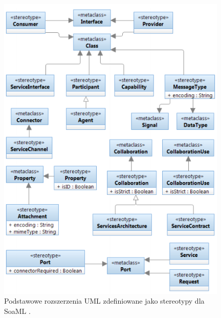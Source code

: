 \begin{figure}[h!tbp]
\begin{centering}
\includegraphics[width=11cm]{img/soaml_metamodel.png}
\caption[Podstawowe rozszerzenia UML zdefiniowane jako stereotypy dla SoaML.]{Podstawowe rozszerzenia UML zdefiniowane jako stereotypy dla SoaML \cite{SoaMLErvBase}.}\label{soaml_metamodel}
\end{centering}
\end{figure}

